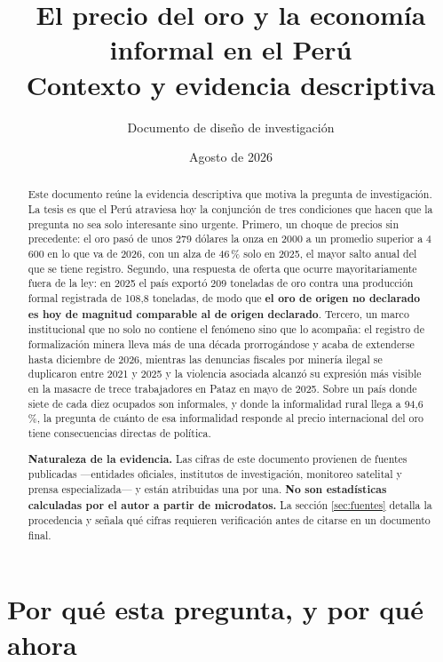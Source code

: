 \documentclass[11pt,a4paper]{article}
\title{\textbf{El precio del oro y la economía informal en el Perú}\\[0.6em]
\large Contexto y evidencia descriptiva}
\author{Documento de diseño de investigación}
\date{Agosto de 2026}
\begin{document}
\maketitle

\begin{abstract}
\noindent Este documento reúne la evidencia descriptiva que motiva la pregunta de investigación. La tesis es que el Perú atraviesa hoy la conjunción de tres condiciones que hacen que la pregunta no sea solo interesante sino urgente. Primero, un choque de precios sin precedente: el oro pasó de unos 279 dólares la onza en 2000 a un promedio superior a 4\,600 en lo que va de 2026, con un alza de 46\,\% solo en 2025, el mayor salto anual del que se tiene registro. Segundo, una respuesta de oferta que ocurre mayoritariamente fuera de la ley: en 2025 el país exportó 209 toneladas de oro contra una producción formal registrada de 108{,}8 toneladas, de modo que \textbf{el oro de origen no declarado es hoy de magnitud comparable al de origen declarado}. Tercero, un marco institucional que no solo no contiene el fenómeno sino que lo acompaña: el registro de formalización minera lleva más de una década prorrogándose y acaba de extenderse hasta diciembre de 2026, mientras las denuncias fiscales por minería ilegal se duplicaron entre 2021 y 2025 y la violencia asociada alcanzó su expresión más visible en la masacre de trece trabajadores en Pataz en mayo de 2025. Sobre un país donde siete de cada diez ocupados son informales, y donde la informalidad rural llega a 94{,}6\,\%, la pregunta de cuánto de esa informalidad responde al precio internacional del oro tiene consecuencias directas de política.

\medskip
\noindent\textbf{Naturaleza de la evidencia.} Las cifras de este documento provienen de fuentes publicadas ---entidades oficiales, institutos de investigación, monitoreo satelital y prensa especializada--- y están atribuidas una por una. \textbf{No son estadísticas calculadas por el autor a partir de microdatos.} La sección \ref{sec:fuentes} detalla la procedencia y señala qué cifras requieren verificación antes de citarse en un documento final.
\end{abstract}

\newpage
\onehalfspacing

\section{Por qué esta pregunta, y por qué ahora}
\end{document}
